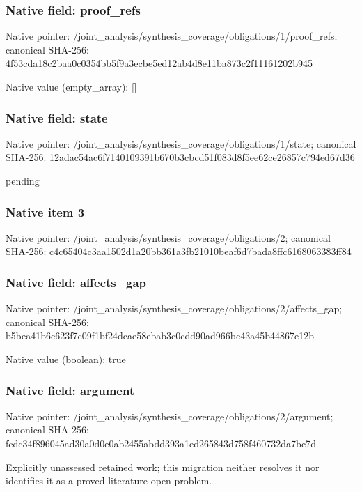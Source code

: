 \documentclass[10pt,a4paper]{article}
\begin{document}
\subsubsection{Native field: proof\_\allowbreak{}refs}
Native pointer: /joint\_\allowbreak{}analysis/synthesis\_\allowbreak{}coverage/obligations/1/proof\_\allowbreak{}refs; canonical SHA-256: 4f53cda18c2baa0c0354bb5f9a3ecbe5ed12ab4d8e11ba873c2f11161202b945

Native value (empty\_\allowbreak{}array): []

\subsubsection{Native field: state}
Native pointer: /joint\_\allowbreak{}analysis/synthesis\_\allowbreak{}coverage/obligations/1/state; canonical SHA-256: 12adac54ac6f7140109391b670b3cbcd51f083d8f5ee62ce26857c794ed67d36

\begingroup\raggedright\sloppy pending\par\endgroup

\subsubsection{Native item 3}
Native pointer: /joint\_\allowbreak{}analysis/synthesis\_\allowbreak{}coverage/obligations/2; canonical SHA-256: c4c65404c3aa1502d1a20bb361a3fb21010beaf6d7bada8ffc6168063383ff84

\subsubsection{Native field: affects\_\allowbreak{}gap}
Native pointer: /joint\_\allowbreak{}analysis/synthesis\_\allowbreak{}coverage/obligations/2/affects\_\allowbreak{}gap; canonical SHA-256: b5bea41b6c623f7c09f1bf24dcae58ebab3c0cdd90ad966bc43a45b44867e12b

Native value (boolean): true

\subsubsection{Native field: argument}
Native pointer: /joint\_\allowbreak{}analysis/synthesis\_\allowbreak{}coverage/obligations/2/argument; canonical SHA-256: fcdc34f896045ad30a0d0e0ab2455abdd393a1ed265843d758f460732da7bc7d

\begingroup\raggedright\sloppy Explicitly unassessed retained work;\allowbreak{} this migration neither resolves it nor identifies it as a proved literature-open problem.\par\endgroup
\end{document}

